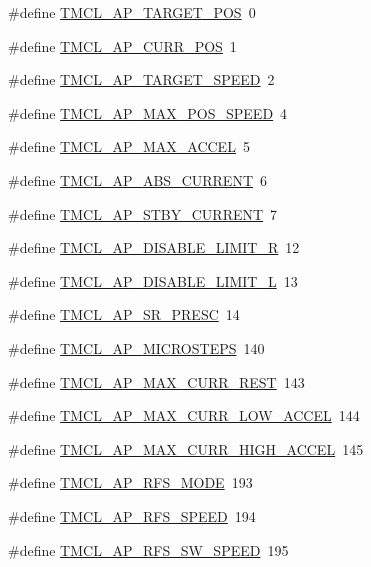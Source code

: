 \begin{DoxyCompactItemize}
\item 
\#define \hyperlink{group__RWParam_ga87dfb3db656c898683ae4a5dd80e789a}{TMCL\_\-AP\_\-TARGET\_\-POS}~0
\item 
\#define \hyperlink{group__RWParam_ga46ffdf772b16b88c99f5b48893b3f710}{TMCL\_\-AP\_\-CURR\_\-POS}~1
\item 
\#define \hyperlink{group__RWParam_ga9f34f155a65163069922f5f20c4c63b5}{TMCL\_\-AP\_\-TARGET\_\-SPEED}~2
\item 
\#define \hyperlink{group__RWParam_gafeecf0d7ec4c89beea4eb6e5dd3d5326}{TMCL\_\-AP\_\-MAX\_\-POS\_\-SPEED}~4
\item 
\#define \hyperlink{group__RWParam_ga5f18e570598b33d3d77b0d0894d81dc7}{TMCL\_\-AP\_\-MAX\_\-ACCEL}~5
\item 
\#define \hyperlink{group__RWParam_gaaf8d5010f2cf9799b5321358b5f5fb35}{TMCL\_\-AP\_\-ABS\_\-CURRENT}~6
\item 
\#define \hyperlink{group__RWParam_ga7e4a74f86decbbced917fb7825aef450}{TMCL\_\-AP\_\-STBY\_\-CURRENT}~7
\item 
\#define \hyperlink{group__RWParam_ga126f3a0bebd82760451aeadab91d6e06}{TMCL\_\-AP\_\-DISABLE\_\-LIMIT\_\-R}~12
\item 
\#define \hyperlink{group__RWParam_ga36067071d35368d2a1b03ddfae1d4eb9}{TMCL\_\-AP\_\-DISABLE\_\-LIMIT\_\-L}~13
\item 
\#define \hyperlink{group__RWParam_gab96353fcd1f433ef38ea445f812d2616}{TMCL\_\-AP\_\-SR\_\-PRESC}~14
\item 
\#define \hyperlink{group__RWParam_gaaf9500c37e13a506bcebb07378bb559c}{TMCL\_\-AP\_\-MICROSTEPS}~140
\item 
\#define \hyperlink{group__RWParam_ga6c4829576ea5ead497c9fd6bc564ecf0}{TMCL\_\-AP\_\-MAX\_\-CURR\_\-REST}~143
\item 
\#define \hyperlink{group__RWParam_gad989938d2101b5e000d5f41ca1d2a522}{TMCL\_\-AP\_\-MAX\_\-CURR\_\-LOW\_\-ACCEL}~144
\item 
\#define \hyperlink{group__RWParam_ga1a3faf0da53cb9d7cc2a84cc326ccc4a}{TMCL\_\-AP\_\-MAX\_\-CURR\_\-HIGH\_\-ACCEL}~145
\item 
\#define \hyperlink{group__RWParam_gaf504e536f23e990387a1b4421fcc49e4}{TMCL\_\-AP\_\-RFS\_\-MODE}~193
\item 
\#define \hyperlink{group__RWParam_ga4c6ebda674b3ce393db587761c169515}{TMCL\_\-AP\_\-RFS\_\-SPEED}~194
\item 
\#define \hyperlink{group__RWParam_ga31404aaf7195272cd4a6ef150d6ea421}{TMCL\_\-AP\_\-RFS\_\-SW\_\-SPEED}~195
\end{DoxyCompactItemize}


